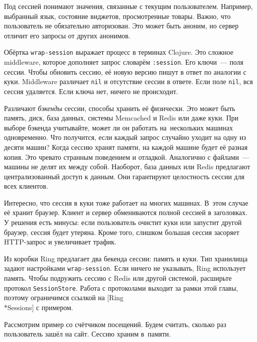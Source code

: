 Под сессией понимают значения, связанные с текущим пользователем. Например,
выбранный язык, состояние виджетов, просмотренные товары. Важно, что
пользователь не обязательно авторизован. Это может быть аноним, но сервер
отличит его запросы от других анонимов.


Обёртка \verb|wrap-session| выражает процесс в терминах Clojure. Это сложное
middleware, которое дополняет запрос словарём \verb|:session|. Его ключи~---
поля сессии. Чтобы обновить сессию, её новую версию пишут в ответ по аналогии с
куки. Middleware различает \verb|nil| и отсутствие сессии в ответе. Если поле
\verb|nil|, вся сессия удаляется. Если ключа нет, ничего не происходит.


Различают \emph{бэкенды} сессии, способы хранить её физически. Это может быть
память, диск, база данных, системы Memcached и Redis или даже куки. При выборе
бэкенда учитывайте, может ли он работать на~нескольких машинах одновременно. Что
получится, если каждый запрос случайно уходит на одну из десяти машин? Когда
сессию хранят памяти, на каждой машине будет её разная копия. Это чревато
странным поведением и отладкой. Аналогично с файлами~--- машины не делят их
между собой. Наоборот, база данных или Redis предлагают централизованный доступ
к данным. Они гарантируют целостность сессии для всех клиентов.

Интересно, что сессия в куки тоже работает на многих машинах. В~этом случае её
хранит браузер. Клиент и сервер обмениваются полной сессией в заголовках. У
решения есть минусы: если пользователь очистит куки или запустит другой браузер,
сессия будет утеряна. Кроме того, слишком большая сессия засоряет HTTP-запрос и
увеличивает трафик.

Из коробки Ring предлагает два бекенда сессии: память и куки. Тип хранилища
задают настройками \verb|wrap-session|. Если ничего не указывать, Ring
использует память. Чтобы подружить сессию с Redis или другой системой, расширьте
протокол \verb|SessionStore|. Работа с протоколами выходит за рамки этой главы,
поэтому ограничимся ссылкой на
[Ring\\*Sessions]
с примером.

Рассмотрим пример со счётчиком посещений. Будем считать, сколько раз
пользователь зашёл на сайт. Сессию храним в~памяти.

